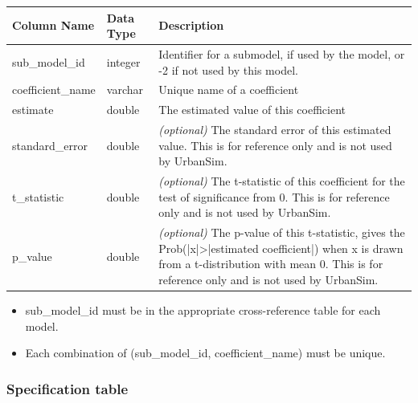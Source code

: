 \begin{tabular}{|l|l|p{4.5in}|}

\hline
\textbf{Column Name} & \textbf{Data Type} & \textbf{Description} \\

\hline
sub_model_id & integer &  Identifier for a submodel, if used by the model, or
-2 if not used by this model. \\

\hline
coefficient_name & varchar & Unique name of a coefficient  \\

\hline
estimate & double & The estimated value of this coefficient \\

\hline
standard_error & double & \emph{(optional) }
The standard error of this estimated value. This is for reference only and is
not used by UrbanSim.  \\

\hline
t_statistic & double & \emph{(optional) }
The t-statistic of this coefficient for the test of significance from 0. This
is for reference only and is not used by UrbanSim.  \\

\hline p_value & double & \emph{(optional) } The p-value of this t-statistic,
gives the Prob(|x|\textgreater{}|estimated coefficient|) when x is drawn from a
t-distribution with mean 0. This is for reference only and is not used by
UrbanSim.   \\

\hline

\end{tabular}

\begin{itemize} \tight
\item sub_model_id must be in the appropriate cross-reference table for each
model.
\item Each combination of (sub_model_id, coefficient_name) must be unique.
\end{itemize}

\subsubsection{Specification table}


